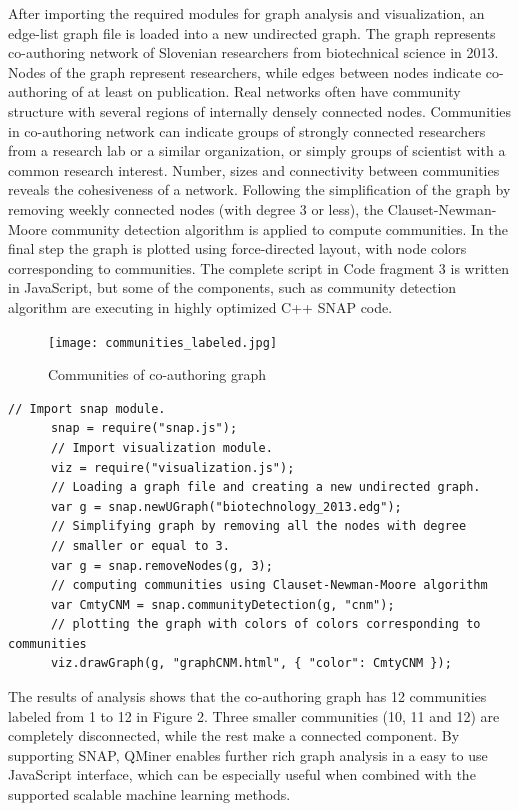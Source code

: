 \documentclass{article} %
\begin{document}
After importing the required modules for graph analysis and visualization, an edge-list graph file is loaded into a new undirected graph. The graph represents co-authoring network of Slovenian researchers from biotechnical science in 2013. Nodes of the graph represent researchers, while edges between nodes indicate co-authoring of at least on publication. Real networks often have community structure with several regions of internally densely connected nodes. Communities in co-authoring network can indicate groups of strongly connected researchers from a research lab or a similar organization, or simply groups of scientist with a common research interest. Number, sizes and connectivity between communities reveals the cohesiveness of a network. Following the simplification of the graph by removing weekly connected nodes (with degree 3 or less), the Clauset-Newman-Moore \cite{clauset-newman-moore} community detection algorithm is applied to compute communities. In the final step the graph is plotted using force-directed layout, with node colors corresponding to communities. The complete script in Code fragment 3 is written in JavaScript, but some of the components, such as community detection algorithm are executing in highly optimized C++ SNAP code.
\begin{figure}[h]
\begin{center}
\texttt{[image: communities\_labeled.jpg]}
\caption{Communities of co-authoring graph}
\end{center}
\end{figure}
      \begin{lstlisting}[caption=Graph analysis]
      // Import snap module.
      snap = require("snap.js");
      // Import visualization module.
      viz = require("visualization.js");
      // Loading a graph file and creating a new undirected graph.
      var g = snap.newUGraph("biotechnology_2013.edg");
      // Simplifying graph by removing all the nodes with degree
      // smaller or equal to 3.
      var g = snap.removeNodes(g, 3);
      // computing communities using Clauset-Newman-Moore algorithm
      var CmtyCNM = snap.communityDetection(g, "cnm");
      // plotting the graph with colors of colors corresponding to communities
      viz.drawGraph(g, "graphCNM.html", { "color": CmtyCNM });
      \end{lstlisting}
The results of analysis shows that the co-authoring graph has 12 communities labeled from 1 to 12 in Figure 2. Three smaller communities (10, 11 and 12) are completely disconnected, while the rest make a connected component. By supporting SNAP, QMiner enables further rich graph analysis in a easy to use JavaScript interface, which can be especially useful when combined with the supported scalable machine learning methods.
\end{document}
